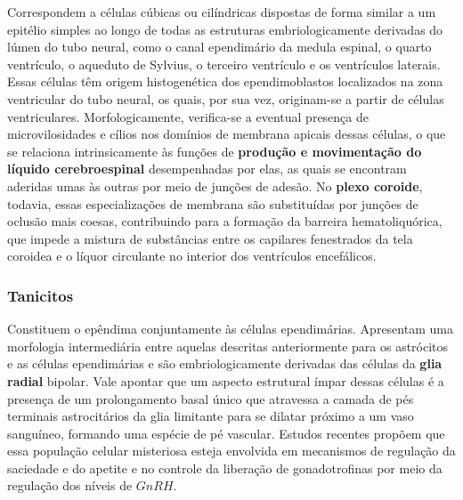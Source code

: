 \documentclass[
]{book}
\theoremstyle{definition}
\theoremstyle{definition}
\theoremstyle{definition}
\theoremstyle{definition}
\theoremstyle{remark}
\begin{document}
Correspondem a células cúbicas ou cilíndricas dispostas de forma similar a um epitélio simples ao longo de todas as estruturas embriologicamente derivadas do lúmen do tubo neural, como o canal ependimário da medula espinal, o quarto ventrículo, o aqueduto de Sylvius, o terceiro ventrículo e os ventrículos laterais. Essas células têm origem histogenética dos ependimoblastos localizados na zona ventricular do tubo neural, os quais, por sua vez, originam-se a partir de células ventriculares. Morfologicamente, verifica-se a eventual presença de microvilosidades e cílios nos domínios de membrana apicais dessas células, o que se relaciona intrinsicamente às funções de \textbf{produção e movimentação do líquido cerebroespinal} desempenhadas por elas, as quais se encontram aderidas umas às outras por meio de junções de adesão. No \textbf{plexo coroide}, todavia, essas especializações de membrana são substituídas por junções de oclusão mais coesas, contribuindo para a formação da barreira hematoliquórica, que impede a mistura de substâncias entre os capilares fenestrados da tela coroidea e o líquor circulante no interior dos ventrículos encefálicos.

\hypertarget{tanicitos}{%
\subsubsection*{Tanicitos}\label{tanicitos}}

Constituem o epêndima conjuntamente às células ependimárias. Apresentam uma morfologia intermediária entre aquelas descritas anteriormente para os astrócitos e as células ependimárias e são embriologicamente derivadas das células da \textbf{glia radial} bipolar. Vale apontar que um aspecto estrutural ímpar dessas células é a presença de um prolongamento basal único que atravessa a camada de pés terminais astrocitários da glia limitante para se dilatar próximo a um vaso sanguíneo, formando uma espécie de pé vascular. Estudos recentes propõem que essa população celular misteriosa esteja envolvida em mecanismos de regulação da saciedade e do apetite e no controle da liberação de gonadotrofinas por meio da regulação dos níveis de \(GnRH\).
\end{document}

